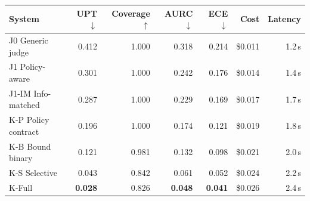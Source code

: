 \begin{tabular}{lrrrrrr}
\toprule
System & UPT $\downarrow$ & Coverage $\uparrow$ & AURC $\downarrow$ & ECE $\downarrow$ & Cost & Latency \\
\midrule
J0 Generic judge   & 0.412 & 1.000 & 0.318 & 0.214 & \$0.011 & 1.2\,s \\
J1 Policy-aware    & 0.301 & 1.000 & 0.242 & 0.176 & \$0.014 & 1.4\,s \\
J1-IM Info-matched & 0.287 & 1.000 & 0.229 & 0.169 & \$0.017 & 1.7\,s \\
K-P Policy contract & 0.196 & 1.000 & 0.174 & 0.121 & \$0.019 & 1.8\,s \\
K-B Bound binary   & 0.121 & 0.981 & 0.132 & 0.098 & \$0.021 & 2.0\,s \\
K-S Selective      & 0.043 & 0.842 & 0.061 & 0.052 & \$0.024 & 2.2\,s \\
K-Full             & \textbf{0.028} & 0.826 & \textbf{0.048} & \textbf{0.041} & \$0.026 & 2.4\,s \\
\bottomrule
\end{tabular}
